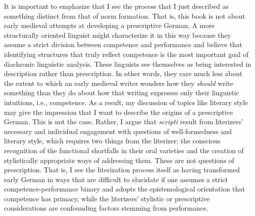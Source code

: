 It is important to emphasize that I see the process that I just described as something distinct from that of norm formation. That is, this book is not about early medieval attempts at developing a prescriptive German. A more structurally oriented linguist might characterize it in this way because they assume a strict division between competence and performance and believe that identifying structures that truly reflect competence is the most important goal of diachronic linguistic analysis. These linguists see themselves as being interested in description rather than prescription. In other words, they care much less about the extent to which an early medieval writer wonders how they \textit{should} write something than they do about how that writing expresses only their linguistic intuitions, i.e., competence. As a result, my discussion of topics like literary style may give the impression that I want to describe the origins of a prescriptive German. This is not the case. Rather, I argue that \textit{scripti} result from literizers’ necessary and individual engagement with questions of well-formedness and literary style, which requires two things from the literizer: the conscious recognition of the functional shortfalls in their oral varieties and the creation of stylistically appropriate ways of addressing them. These are not questions of prescription. That is, I see the literization process itself as having transformed early German in ways that are difficult to elucidate if one assumes a strict competence-performance binary and adopts the epistemological orientation that competence has primacy, while the literizers’ stylistic or prescriptive considerations are confounding factors stemming from performance. 

